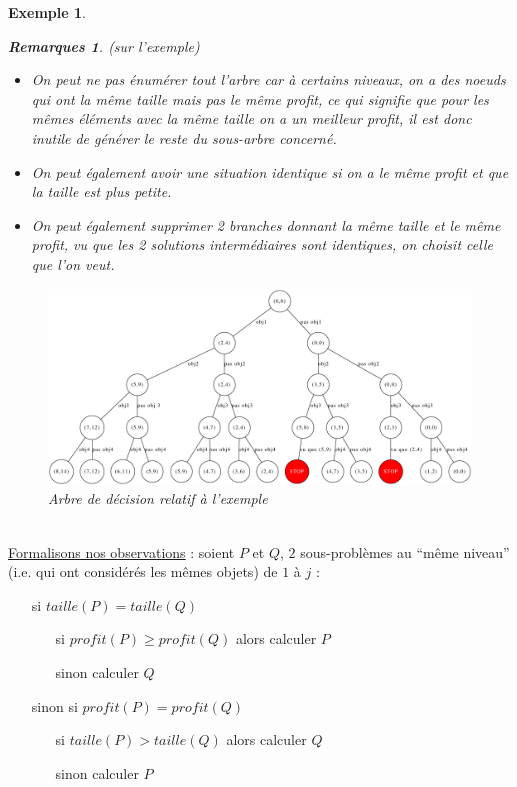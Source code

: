 \documentclass{article}
\newtheorem{exemple}{Exemple}[section]
\newtheorem{rems}{Remarques}[section]
\begin{document}
\begin{sffamily}
\begin{exemple}
\begin{rems}(sur l'exemple)
\begin{itemize}
\item On peut ne pas énumérer tout l'arbre car à certains niveaux, on a des noeuds qui ont la même taille mais pas le même profit, ce qui 
signifie que pour les mêmes éléments avec la même taille on a un meilleur profit, il est donc inutile de générer le reste du sous-arbre 
concerné.
\item On peut également avoir une situation identique si on a le même profit et que la taille est plus petite.
\item On peut également supprimer 2 branches donnant la même taille et le même profit, vu que les 2 solutions intermédiaires sont identiques, 
on choisit celle que l'on veut.
\end{itemize}
\end{rems}

\begin{figure}[h!]
    \begin{center}
    \includegraphics[scale=0.4]{arbredec2.pdf}
    \caption{Arbre de décision relatif à l'exemple}
    \label{bigtree}
    \end{center}	
\end{figure}
\end{exemple}
$ $\\

\noindent \underline{Formalisons nos observations} : soient $P$ et $Q$, $2$ sous-problèmes au ``même niveau''  \\ (i.e. qui ont considérés
les mêmes objets) de $1$ à $j$ :
\begin{itemize}
\item[si] $taille(P) = taille(Q)$
	\begin{itemize}
	\item[si] $profit(P) \geq profit(Q)$ alors calculer $P$
	\item[sinon] calculer $Q$
	\end{itemize}
\item[sinon si] $profit(P) = profit(Q)$
	\begin{itemize}
	\item[si] $taille(P) > taille (Q)$ alors calculer $Q$
	\item[sinon] calculer $P$ \\
	\end{itemize}
\end{itemize}


\end{sffamily}
\end{document}
